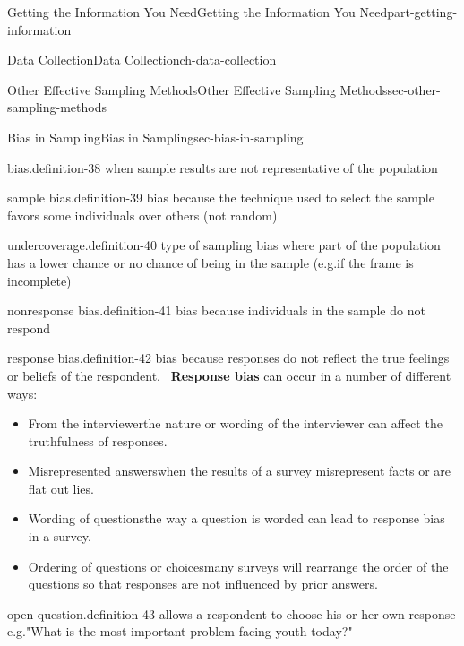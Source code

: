 \documentclass[oneside,10pt,]{book}
\newcommand{\terminology}[1]{\textbf{#1}}
\numberwithin{equation}{section}
\begin{document}
\begin{partptx}{Getting the Information You Need}{}{Getting the Information You Need}{}{}{part-getting-information}
\begin{chapterptx}{Data Collection}{}{Data Collection}{}{}{ch-data-collection}
\begin{sectionptx}{Other Effective Sampling Methods}{}{Other Effective Sampling Methods}{}{}{sec-other-sampling-methods}
\end{sectionptx}
%
%
\typeout{************************************************}
\typeout{************************************************}
%
\begin{sectionptx}{Bias in Sampling}{}{Bias in Sampling}{}{}{sec-bias-in-sampling}
\begin{definition}{bias.}{definition-38}%
when sample results are not representative of the population\end{definition}
\begin{definition}{sample bias.}{definition-39}%
bias because the technique used to select the sample favors some individuals over others (not random)\end{definition}
\begin{definition}{undercoverage.}{definition-40}%
type of sampling bias where part of the population has a lower chance or no chance of being in the sample (e.g.\@ if the frame is incomplete)\end{definition}
\begin{definition}{nonresponse bias.}{definition-41}%
bias because individuals in the sample do not respond\end{definition}
\begin{definition}{response bias.}{definition-42}%
bias because responses do not reflect the true feelings or beliefs of the respondent.~\hypertarget{p-32}{}%
\terminology{Response bias} can occur in a number of different ways:\leavevmode%
\begin{itemize}[label=\textbullet]
\item{}From the interviewer\textemdash{}the nature or wording of the interviewer can affect the truthfulness of responses.%
\item{}Misrepresented answers\textemdash{}when the results of a survey misrepresent facts or are flat out lies.%
\item{}Wording of questions\textemdash{}the way a question is worded can lead to response bias in a survey.%
\item{}Ordering of questions or choices\textemdash{}many surveys will rearrange the order of the questions so that responses are not influenced by prior answers.%
\end{itemize}
%
\end{definition}
\begin{definition}{open question.}{definition-43}%
allows a respondent to choose his or her own response e.g.\@ "What is the most important problem facing youth today?"\end{definition}

\end{sectionptx}
\end{chapterptx}
\end{partptx}
\end{document}

